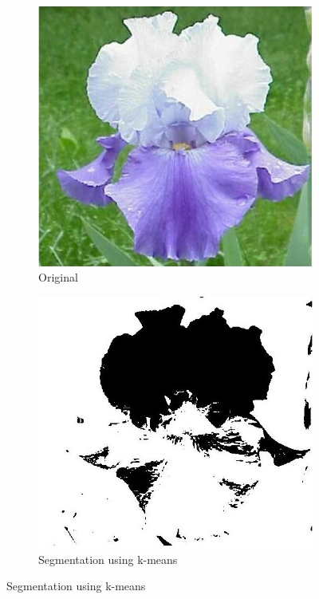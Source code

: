\documentclass[11]{article}
\begin{document}
\begin{figure}[H]
    \begin{subfigure}[t]{0.45\textwidth}
    \centering
  \includegraphics[scale=0.25]{images/segmentation0.jpg}
    \caption{Original}
    \label{segmentation0}
    \end{subfigure}
    \begin{subfigure}[t]{0.45\textwidth}
    \centering
    \includegraphics[scale=0.25]{images/segmentation1.jpg}
    \caption{Segmentation using k-means}
    \label{segmentation1}
    \end{subfigure}
\end{figure}
\end{document}

